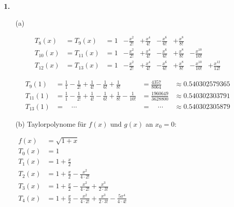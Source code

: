 \documentclass[a4paper,11pt,fleqn]{scrartcl}
\author{\authorinfo}
\title{\titleinfo}
\date{\today}
\begin{document}
\maketitle
\begin{enumerate}
    \item[\textbf{1.}]
        \begin{enumerate}
            \item[(a)]

                \[\begin{array}{lllllllll}
                    T_8(x) &= T_9(x) &= 1 &- \frac{x^2}{2!} &+ \frac{x^4}{4!} &- \frac{x^6}{6!} &+ \frac{x^8}{8!}\\[1em]
                    T_{10}(x) &= T_{11}(x) &= 1 &- \frac{x^2}{2!} &+ \frac{x^4}{4!} &- \frac{x^6}{6!} &+ \frac{x^8}{8!} &- \frac{x^{10}}{10!}\\[1em]
                    T_{12}(x) &= T_{13}(x) &= 1 &- \frac{x^2}{2!} &+ \frac{x^4}{4!} &- \frac{x^6}{6!} &+ \frac{x^8}{8!} &- \frac{x^{10}}{10!} &+ \frac{x^{12}}{12!}
                \end{array}\]

                \[\begin{array}{llll}
                    T_9(1) &= \frac{1}{1} - \frac{1}{2!} + \frac{1}{4!} - \frac{1}{6!} + \frac{1}{8!} &= \frac{4357}{8064} &\approx 0.540302579365\\[1em]
                    T_{11}(1) &= \frac{1}{1} - \frac{1}{2!} + \frac{1}{4!} - \frac{1}{6!} + \frac{1}{8!} - \frac{1}{10!} &= \frac{1960649}{3628800} &\approx 0.540302303791\\[1em]
                    T_{13}(1) &= \hspace{1em}\cdots &= \hspace{1em}\cdots &\approx 0.540302305879
                \end{array}\]

            \item[(b)]
                Taylorpolynome für $f(x)$ und $g(x)$ an $x_0 = 0$:
                \begin{multicols}{2}
                    \(\begin{array}{ll}
                        f(x)   &= \sqrt{1+x} \\[0.6em]
                        T_0(x) &= 1 \\[0.3em]
                        T_1(x) &= 1 + \frac{x}{2} \\[0.3em]
                        T_2(x) &= 1 + \frac{x}{2} - \frac{x^2}{4 \cdot 2!} \\[0.3em]
                        T_3(x) &= 1 + \frac{x}{2} - \frac{x^2}{4 \cdot 2!} + \frac{x^3}{2 \cdot 3!} \\[0.3em]
                        T_4(x) &= 1 + \frac{x}{2} - \frac{x^2}{4 \cdot 2!} + \frac{x^3}{2 \cdot 3!} - \frac{5x^4}{4 \cdot 4!}
                    \end{array}\)


\end{multicols}
\end{enumerate}
\end{enumerate}
\end{document}
